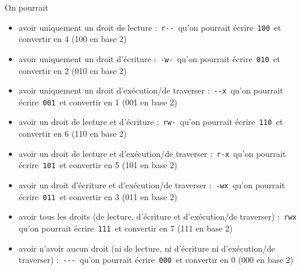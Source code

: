 \documentclass[11pt,a4paper]{article}
\begin{document}
            \par
        
				  On pourrait 
				  
					\begin{itemize}
				
			\item 
              avoir uniquement un droit de lecture : \,\verb|r--|\, 
              qu'on pourrait \'ecrire \,\verb|100|\,
              et convertir en 4 (100 en base 2)
            
			\item 
              avoir uniquement un droit d'\'ecriture : \,\verb|-w-|\, 
              qu'on pourrait \'ecrire \,\verb|010|\,
              et convertir en 2 (010 en base 2)
            
			\item 
              avoir uniquement un droit d'ex\'ecution/de traverser : \,\verb|--x|\, 
              qu'on pourrait \'ecrire \,\verb|001|\,
              et convertir en 1 (001 en base 2)
            
			\item 
              avoir un droit de lecture et d'\'ecriture : \,\verb|rw-|\, 
              qu'on pourrait \'ecrire \,\verb|110|\,
              et convertir en 6 (110 en base 2)
            
			\item 
              avoir un droit de lecture et d'ex\'ecution/de traverser : \,\verb|r-x|\, 
              qu'on pourrait \'ecrire \,\verb|101|\,
              et convertir en 5 (101 en base 2)
            
			\item 
              avoir un droit d'\'ecriture et d'ex\'ecution/de traverser : \,\verb|-wx|\, 
              qu'on pourrait \'ecrire \,\verb|011|\,
              et convertir en 3 (011 en base 2)
            
			\item 
              avoir tous les droits (de lecture, d'\'ecriture et d'ex\'ecution/de traverser) : \,\verb|rwx|\, 
              qu'on pourrait \'ecrire \,\verb|111|\,
              et convertir en 7 (111 en base 2)
            
			\item 
              avoir n'avoir aucun droit (ni de lecture, ni d'\'ecriture ni d'ex\'ecution/de traverser) : \,\verb|---|\, 
              qu'on pourrait \'ecrire \,\verb|000|\,
              et convertir en 0 (000 en base 2)
            
					\end{itemize}
				
\end{document}

